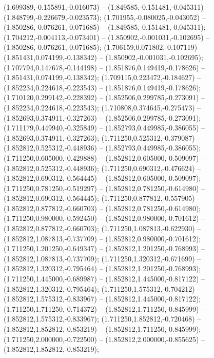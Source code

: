  (1.699389,-0.155891,-0.016073) -- (1.849585,-0.151481,-0.045311) -- (1.848799,-0.226679,-0.023573);
 (1.701955,-0.080025,-0.043052) -- (1.850286,-0.076261,-0.071685) -- (1.849585,-0.151481,-0.045311);
 (1.704212,-0.004113,-0.073401) -- (1.850902,-0.001031,-0.102695) -- (1.850286,-0.076261,-0.071685);
 (1.706159,0.071802,-0.107119) -- (1.851431,0.074199,-0.138342) -- (1.850902,-0.001031,-0.102695);
 (1.707794,0.147678,-0.144198) -- (1.851876,0.149419,-0.178626) -- (1.851431,0.074199,-0.138342);
 (1.709115,0.223472,-0.184627) -- (1.852234,0.224618,-0.223543) -- (1.851876,0.149419,-0.178626);
 (1.710120,0.299142,-0.228392) -- (1.852506,0.299785,-0.273091) -- (1.852234,0.224618,-0.223543);
 (1.710808,0.374645,-0.275473) -- (1.852693,0.374911,-0.327263) -- (1.852506,0.299785,-0.273091);
 (1.711179,0.449940,-0.325849) -- (1.852793,0.449985,-0.386055) -- (1.852693,0.374911,-0.327263);
 (1.711250,0.525312,-0.379087) -- (1.852812,0.525312,-0.448936) -- (1.852793,0.449985,-0.386055);
 (1.711250,0.605000,-0.429888) -- (1.852812,0.605000,-0.509097) -- (1.852812,0.525312,-0.448936);
 (1.711250,0.690312,-0.476624) -- (1.852812,0.690312,-0.564445) -- (1.852812,0.605000,-0.509097);
 (1.711250,0.781250,-0.519297) -- (1.852812,0.781250,-0.614980) -- (1.852812,0.690312,-0.564445);
 (1.711250,0.877812,-0.557905) -- (1.852812,0.877812,-0.660703) -- (1.852812,0.781250,-0.614980);
 (1.711250,0.980000,-0.592450) -- (1.852812,0.980000,-0.701612) -- (1.852812,0.877812,-0.660703);
 (1.711250,1.087813,-0.622930) -- (1.852812,1.087813,-0.737709) -- (1.852812,0.980000,-0.701612);
 (1.711250,1.201250,-0.649347) -- (1.852812,1.201250,-0.768993) -- (1.852812,1.087813,-0.737709);
 (1.711250,1.320312,-0.671699) -- (1.852812,1.320312,-0.795464) -- (1.852812,1.201250,-0.768993);
 (1.711250,1.445000,-0.689987) -- (1.852812,1.445000,-0.817122) -- (1.852812,1.320312,-0.795464);
 (1.711250,1.575312,-0.704212) -- (1.852812,1.575312,-0.833967) -- (1.852812,1.445000,-0.817122);
 (1.711250,1.711250,-0.714372) -- (1.852812,1.711250,-0.845999) -- (1.852812,1.575312,-0.833967);
 (1.711250,1.852812,-0.720468) -- (1.852812,1.852812,-0.853219) -- (1.852812,1.711250,-0.845999);
 (1.711250,2.000000,-0.722500) -- (1.852812,2.000000,-0.855625) -- (1.852812,1.852812,-0.853219);

